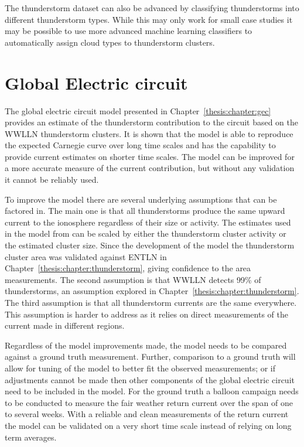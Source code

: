 The thunderstorm dataset can also be advanced by classifying thunderstorms into different thunderstorm types.
While this may only work for small case studies it may be possible to use more advanced machine learning classifiers to automatically assign cloud types to thunderstorm clusters.

\section{Global Electric circuit}

The global electric circuit model presented in Chapter~\ref{thesis:chapter:gec} provides an estimate of the thunderstorm contribution to the circuit based on the WWLLN thunderstorm clusters.
It is shown that the model is able to reproduce the expected Carnegie curve over long time scales and has the capability to provide current estimates on shorter time scales.
The model can be improved for a more accurate measure of the current contribution, but without any validation it cannot be reliably used.

To improve the model there are several underlying assumptions that can be factored in.
The main one is that all thunderstorms produce the same upward current to the ionosphere regardless of their size or activity.
The estimates used in the model from \citet{Mach2010} can be scaled by either the thunderstorm cluster activity or the estimated cluster size.
Since the development of the model the thunderstorm cluster area was validated against ENTLN in Chapter~\ref{thesis:chapter:thunderstorm}, giving confidence to the area measurements.
The second assumption is that WWLLN detects 99\% of thunderstorms, an assumption explored in Chapter~\ref{thesis:chapter:thunderstorm}.
The third assumption is that all thunderstorm currents are the same everywhere.
This assumption is harder to address as it relies on direct measurements of the current made in different regions.

Regardless of the model improvements made, the model needs to be compared against a ground truth measurement.
Further, comparison to a ground truth will allow for tuning of the model to better fit the observed measurements; or if adjustments cannot be made then other components of the global electric circuit need to be included in the model.
For the ground truth a balloon campaign needs to be conducted to measure the fair weather return current over the span of one to several weeks.
With a reliable and clean measurements of the return current the model can be validated on a very short time scale instead of relying on long term averages.

